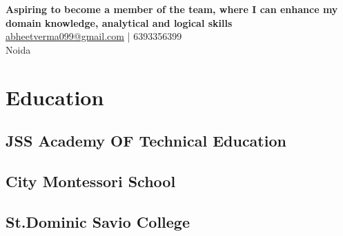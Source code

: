 \documentclass[]{resume-openfont}
\begin{document}
%
%
\lastupdated

%
%


{
\textbf{Aspiring to become a member of the team, where I can enhance my domain knowledge, analytical and logical skills}
 \\
\href{mailto:abheetverma099@gmail.com}{abheetverma099@gmail.com} | 6393356399\\Noida
}

%
%

\begin{minipage}[t]{0.33\textwidth} 


\section{Education} 

\subsection{JSS Academy OF Technical Education}
\sectionsep



\subsection{City Montessori School}
\sectionsep

\subsection{St.Dominic Savio College}
\sectionsep



\end{minipage}
\end{document}
